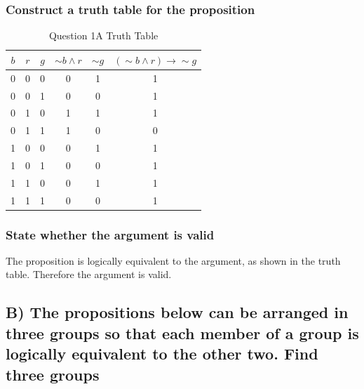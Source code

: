 \documentclass[12pt,a4paper]{article}
\begin{document}
\subsubsection{Construct a truth table for the proposition}
\begin{table}[h]
\centering
\caption{Question 1A Truth Table}
\begin{tabular}{c|c|c|c|c|c}
$b$ & $r$ & $g$ & $\sim{b} \wedge r$ & $\sim{g}$ & $(\sim{b} \wedge r) \rightarrow \sim{g}$ \\
\hline
0 & 0 & 0 & 0 & 1 & 1 \\
\hline
0 & 0 & 1 & 0 & 0 & 1 \\
\hline
0 & 1 & 0 & 1 & 1 & 1 \\
\hline
0 & 1 & 1 & 1 & 0 & 0 \\
\hline
1 & 0 & 0 & 0 & 1 & 1 \\
\hline
1 & 0 & 1 & 0 & 0 & 1 \\
\hline
1 & 1 & 0 & 0 & 1 & 1 \\
\hline
1 & 1 & 1 & 0 & 0 & 1 \\
\end{tabular}
\end{table}

\subsubsection{State whether the argument is valid}

The proposition is logically equivalent to the argument, as shown in the truth table. Therefore the argument is valid.


\newpage
\subsection{B) The propositions below can be arranged in three groups so that each member of a group is logically equivalent to the other two. Find three groups}
\end{document}
